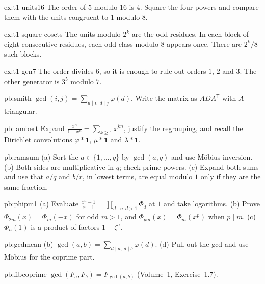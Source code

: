\begin{hint}{ex:t1-units16}
The order of $5$ modulo $16$ is $4$. Square the four powers and compare them with the units congruent to $1$ modulo $8$.
\end{hint}
\begin{hint}{ex:t1-square-cosets}
The units modulo $2^k$ are the odd residues. In each block of eight consecutive residues, each odd class modulo $8$ appears once. There are $2^k/8$ such blocks.
\end{hint}

\begin{hint}{ex:t1-gen7}
The order divides $6$, so it is enough to rule out orders $1$, $2$ and $3$. The other generator is $3^5$ modulo $7$.
\end{hint}

\begin{hint}{pb:smith}
$\gcd(i,j)=\sum_{d\mid i,\ d\mid j}\varphi(d)$. Write the matrix as $ADA^{\mathsf T}$ with $A$ triangular.
\end{hint}

\begin{hint}{pb:lambert}
Expand $\frac{x^n}{1-x^n}=\sum_{k\ge1}x^{kn}$, justify the regrouping, and recall the Dirichlet convolutions $\varphi*\mathbf1$,
$\mu*\mathbf1$ and $\lambda*\mathbf1$.
\end{hint}

\begin{hint}{pb:ramsum}
(a) Sort the $a\in\{1,\dots,q\}$ by $\gcd(a,q)$ and use Möbius inversion. (b) Both sides are multiplicative in $q$; check
prime powers. (c) Expand both sums and use that $a/q$ and $b/r$, in lowest terms, are equal modulo $1$ only if they are
the same fraction.
\end{hint}

\begin{hint}{pb:phipm1}
(a) Evaluate $\frac{x^n-1}{x-1}=\prod_{d\mid n,d>1}\Phi_d$ at $1$ and take logarithms. (b) Prove $\Phi_{2m}(x)=\Phi_m(-x)$
for odd $m>1$, and $\Phi_{pm}(x)=\Phi_m(x^p)$ when $p\mid m$. (c) $\Phi_n(1)$ is a product of factors $1-\zeta^a$.
\end{hint}

\begin{hint}{pb:gcdmean}
(b) $\gcd(a,b)=\sum_{d\mid a,\ d\mid b}\varphi(d)$. (d) Pull out the gcd and use Möbius for the coprime part.
\end{hint}

\begin{hint}{pb:fibcoprime}
$\gcd(F_a,F_b)=F_{\gcd(a,b)}$ (Volume~1, Exercise~1.7).
\end{hint}

